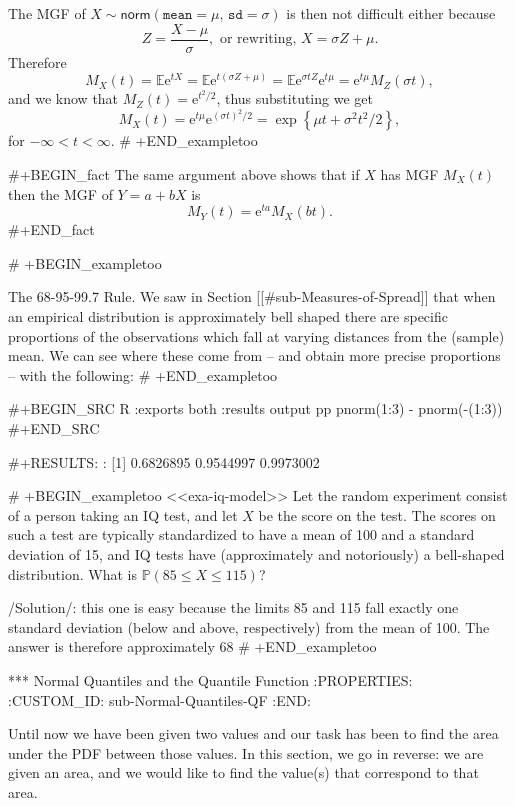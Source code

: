 The MGF of
\(X\sim\mathsf{norm}(\mathtt{mean}=\mu,\,\mathtt{sd}=\sigma)\) is then
not difficult either because \[ Z=\frac{X-\mu}{\sigma},\mbox{ or
rewriting, }X=\sigma Z+\mu.  \] Therefore \[
M_{X}(t)=\mathbb{E}\mathrm{e}^{tX}=\mathbb{E}\mathrm{e}^{t(\sigma
Z+\mu)}=\mathbb{E}\mathrm{e}^{\sigma
tZ}\mathrm{e}^{t\mu}=\mathrm{e}^{t\mu}M_{Z}(\sigma t), \] and we know
that \(M_{Z}(t)=\mathrm{e}^{t^{2}/2}\), thus substituting we get \[
M_{X}(t)=\mathrm{e}^{t\mu}\mathrm{e}^{(\sigma t)^{2}/2}=\exp\left\{
\mu t+\sigma^{2}t^{2}/2\right\} , \] for \(-\infty<t<\infty\).
# +END_exampletoo


#+BEGIN_fact
The same argument above shows that if \(X\) has MGF \(M_{X}(t)\) then
the MGF of \(Y=a+bX\) is
\begin{equation}
M_{Y}(t)=\mathrm{e}^{ta}M_{X}(bt).
\end{equation}
#+END_fact

# +BEGIN_exampletoo

The 68-95-99.7 Rule. We saw in Section [[#sub-Measures-of-Spread]] that when an
empirical distribution is approximately bell shaped there are specific
proportions of the observations which fall at varying distances from
the (sample) mean. We can see where these come from -- and obtain more
precise proportions -- with the following:
# +END_exampletoo


#+BEGIN_SRC R :exports both :results output pp 
pnorm(1:3) - pnorm(-(1:3))
#+END_SRC

#+RESULTS:
: [1] 0.6826895 0.9544997 0.9973002

# +BEGIN_exampletoo
<<exa-iq-model>> Let the random experiment consist of a person taking
an IQ test, and let \(X\) be the score on the test. The scores on such
a test are typically standardized to have a mean of 100 and a standard
deviation of 15, and IQ tests have (approximately and notoriously) a
bell-shaped distribution. What is \(\mathbb{P}(85\leq X\leq115)\)?

/Solution/: this one is easy because the limits 85 and 115 fall
exactly one standard deviation (below and above, respectively) from
the mean of 100. The answer is therefore approximately 68%
# +END_exampletoo

*** Normal Quantiles and the Quantile Function
:PROPERTIES:
:CUSTOM_ID: sub-Normal-Quantiles-QF
:END:

Until now we have been given two values and our task has been to find
the area under the PDF between those values. In this section, we go in
reverse: we are given an area, and we would like to find the value(s)
that correspond to that area.

